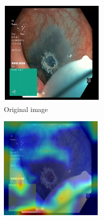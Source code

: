 \begin{figure}
     \centering
     \begin{subfigure}[t]{0.3\textwidth}
         \centering
         \includegraphics[width=\textwidth]{methodology/figures/sal1.png}
         \caption{Original image}
         \label{fig:sal1}
     \end{subfigure}
     \hfill
     \begin{subfigure}[t]{0.3\textwidth}
         \centering
         \includegraphics[width=\textwidth]{methodology/figures/sal2.png}

\end{subfigure}
\end{figure}
